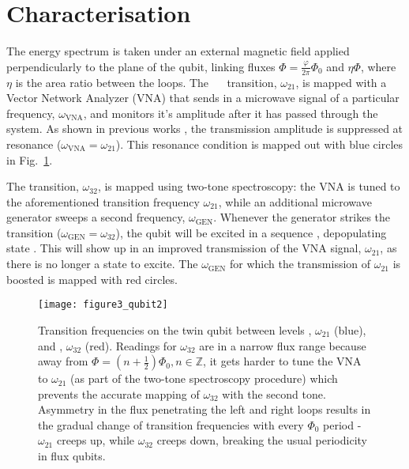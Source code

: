\section{Characterisation}
\label{sec:characterisation}
\noindent The energy spectrum is taken under an external magnetic
field applied perpendicularly to the plane of the qubit, linking
fluxes $ \Phi = \frac{\varphi}{2\pi}\Phi_0$ and $ \eta\Phi $, where
$ \eta $ is the area ratio between the loops. The ~\ilra~
transition, $\omega_{21}$, is mapped with a Vector Network Analyzer (VNA)
that sends in a microwave signal of a particular frequency,
$\omega_{\text{VNA}}$, and monitors it's amplitude after it has passed
through the system. As shown in previous works \cite{abdumalikov2010},
the transmission amplitude is suppressed at resonance
($\omega_{\text{VNA}}=\omega_{21}$). This resonance condition is mapped out with
blue circles in Fig.~\ref{fig:experiment}.

The \ilra{} transition, $\omega_{32}$, is mapped using
two-tone spectroscopy: the VNA is tuned to the aforementioned
transition frequency $ \omega_{21} $, while an additional microwave
generator sweeps a second frequency, $ \omega_{\text{GEN}} $. Whenever the
generator strikes the \ira{} transition
($\omega_{\text{GEN}} = \omega_{32} $), the qubit will be excited in a sequence
   ,
depopulating state . This will show up in an improved
transmission of the VNA signal, $\omega_{21}$, as there is no longer a
state  to excite. The $\omega_{\text{GEN}}$ for which the
transmission of $\omega_{21}$ is boosted is mapped with red circles.


\begin{figure}[h]
  \texttt{[image: figure3\_qubit2]}
  \caption{\small Transition frequencies on the twin qubit between
    levels \ilra {}, $ \omega_{21} $ (blue), and 
    \ilra {}, $ \omega_{32}$ (red).  Readings for
    $ \omega_{32} $ are in a narrow flux range because away from
    $ \Phi = (n + \frac{1}{2})\Phi_0, n\in\mathbb{Z} $, it gets harder to tune
    the VNA to $ \omega_{21} $ (as part of the two-tone spectroscopy
    procedure) which prevents the accurate mapping of $ \omega_{32} $ with
    the second tone.  Asymmetry in the flux penetrating the left and
    right loops results in the gradual change of transition
    frequencies with every $ \Phi_{0} $ period - $\omega_{21}$ creeps up,
    while $\omega_{32}$ creeps down, breaking the usual periodicity in flux
    qubits.}
  \label{fig:experiment}
\end{figure}

